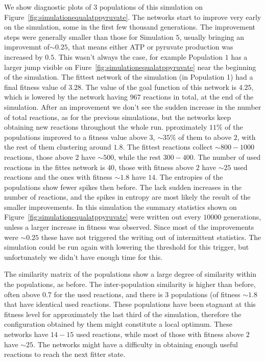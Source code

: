 \documentclass[a4paper,12pt]{article}
\begin{document}
We show diagnostic plots of $3$ populations of this simulation on Figure~\ref{fig:simulationequalatppyruvate}. The networks start to improve very early on the simulation, some in the first few thousand generations. The improvement steps were generally smaller than those for Simulation $5$, usually bringing an improvemnt of$\sim 0.25$, that means either ATP or pyruvate production was increased by $0.5$. This wasn't always the case, for example Population $1$ has a larger jump visible on Fiure~\ref{fig:simulationequalatppyruvate} near the beginning of the simulation. The fittest network of the simulation (in Population 1) had a final fitness value of $3.28$. The value of the goal function of this network is $4.25$, which is lowered by the network having $967$ reactions in total, at the end of the simulation. After an improvement we don't see the sudden increase in the number of total reactions, as for the previous simulations, but the networks keep obtaining new reactions throughout the whole run. pproximately $11\%$ of the populations improved to a fitness value above $3$, $\sim 35\%$ of them to above $2$, with the rest of them clustering around $1.8$. The fittest reactions collect $\sim 800-1000$ reactions, those above $2$ have $\sim 500$, while the rest $300-400$. The number of used reactions in the fittes network is $40$, those with fitness above $2$ have $\sim 25$ used reactions and the ones with fitness $\sim1.8$ have $14$. The entropies of the populations show fewer spikes then before. The lack sudden increases in the number of reactions, and the spikes in entropy are most likely the result of the smaller improvements. In this simulation the summary statistics shown on Figure~\ref{fig:simulationequalatppyruvate} were written out every $10000$ generations, unless a larger increase in fitness was observed. Since most of the improvements were $\sim 0.25$ these have not triggered the writing out of intermittent statistics. The simulation could be run again with lowering the threshold for this trigger, but unfortunately we didn't have enough time for this. 

The similarity matrix of the populations show a large degree of similarity within the populations, as before. The inter-population similarity is higher than before, often above $0.7$ for the used reactions, and there is $3$ populations (of fitness $\sim 1.8$ that have identical used reactions. These populations have been stagnant at this fitness level for approximately the last third of the simulation, therefore the configuration obtained by them might constitute a local optimum. These networks have $14-15$ used reactions, while most of those with fitness above $2$ have $\sim 25$. The networks might have a difficulty in obtaining enough useful reactions to reach the next fitter state. 
\end{document}
